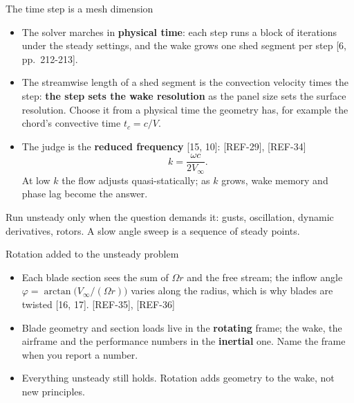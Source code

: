 \begin{frame}{The time step is a mesh dimension}
\begin{itemize}\small
  \item The solver marches in \textbf{physical time}: each step runs a block of
        iterations under the steady settings, and the wake grows one shed
        segment per step [6, pp.~212-213].
  \item The streamwise length of a shed segment is the convection velocity
        times the step: \textbf{the step sets the wake resolution} as the panel
        size sets the surface resolution. Choose it from a physical time the
        geometry has, for example the chord's convective time \(t_c = c/V\).
  \item The judge is the \textbf{reduced frequency} [15, 10]: [REF-29], [REF-34]
        \[ k = \frac{\omega c}{2 V_\infty}. \]
        At low \(k\) the flow adjusts quasi-statically; as \(k\) grows, wake
        memory and phase lag become the answer.
\end{itemize}
\begin{takeaway}Run unsteady only when the question demands it: gusts,
oscillation, dynamic derivatives, rotors. A slow angle sweep is a sequence of
steady points.\end{takeaway}
\end{frame}

\begin{frame}{Rotation added to the unsteady problem}
\begin{itemize}\small
  \item Each blade section sees the sum of \(\Omega r\) and the free stream;
        the inflow angle \(\varphi = \arctan\big(V_\infty / (\Omega r)\big)\)
        varies along the radius, which is why blades are twisted [16, 17]. [REF-35], [REF-36]
  \item Blade geometry and section loads live in the \textbf{rotating} frame;
        the wake, the airframe and the performance numbers in the
        \textbf{inertial} one. Name the frame when you report a number.
  \item Everything unsteady still holds. Rotation adds geometry to the wake,
        not new principles.
\end{itemize}
\end{frame}

